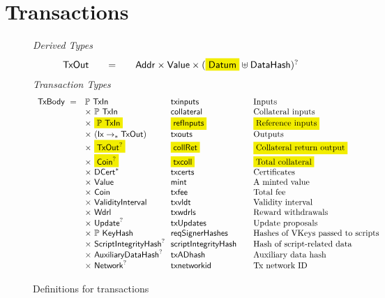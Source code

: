 \section{Transactions}
\label{sec:transactions}
\begin{figure*}[htb]
  \emph{Derived Types}
  \begin{equation*}
    \begin{array}{l@{\qquad=\qquad}lr}
      \TxOut & \Addr \times \Value \times (\hldiff{\Datum} \uniondistinct \DataHash)^?
    \end{array}
  \end{equation*}
  \emph{Transaction Types}
  \begin{equation*}
    \begin{array}{r@{~~}l@{~~}l@{\qquad}l}
      \TxBody ~=~
      & \powerset{\TxIn} & \fun{txinputs}& \text{Inputs}\\
      & \times ~\powerset{\TxIn} & \fun{collateral} & \text{Collateral inputs}\\
      & \times ~\hldiff{\powerset{\TxIn}} & \hldiff{\fun{refInputs}} & \hldiff{\text{Reference inputs}}\\
      & \times ~(\Ix \pto \TxOut) & \fun{txouts}& \text{Outputs}\\
      & \times ~\hldiff{\TxOut^?} & \hldiff{\fun{collRet}} & \hldiff{\text{Collateral return output}}\\
      & \times ~\hldiff{\Coin^?} & \hldiff{\fun{txcoll}} & \hldiff{\text{Total collateral}}\\
      & \times~ \seqof{\DCert} & \fun{txcerts}& \text{Certificates}\\
       & \times ~\Value  & \fun{mint} &\text{A minted value}\\
       & \times ~\Coin & \fun{txfee} &\text{Total fee}\\
       & \times ~\ValidityInterval & \fun{txvldt} & \text{Validity interval}\\
       & \times~ \Wdrl  & \fun{txwdrls} &\text{Reward withdrawals}\\
       & \times ~\Update^?  & \fun{txUpdates} & \text{Update proposals}\\
       & \times ~\powerset{\KeyHash} & \fun{reqSignerHashes} & \text{Hashes of VKeys passed to scripts}\\
       & \times ~\ScriptIntegrityHash^? & \fun{scriptIntegrityHash} & \text{Hash of script-related data}\\
       & \times ~\AuxiliaryDataHash^? & \fun{txADhash} & \text{Auxiliary data hash}\\
       & \times ~\Network^? & \fun{txnetworkid} & \text{Tx network ID}\\
    \end{array}
  \end{equation*}
  \caption{Definitions for transactions}
  \label{fig:defs:utxo-shelley-2}
\end{figure*}

